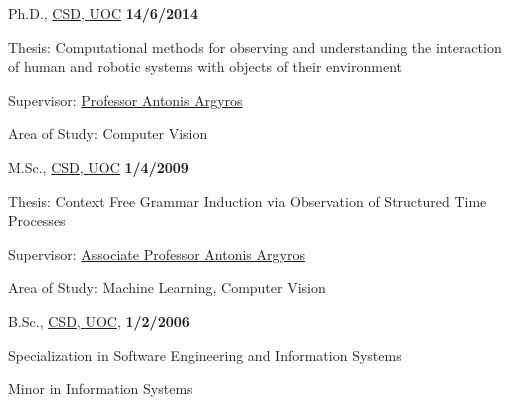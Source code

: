 \documentclass[10pt]{article}
\newenvironment{outerlist}[1][\enskip\textbullet]%
        {\begin{itemize}[#1]}{\end{itemize}%
         \vspace{-.6\baselineskip}}
\newenvironment{innerlist}[1][\enskip\textbullet]%
        {\begin{compactitem}[#1]}{\end{compactitem}}
\begin{document}
\begin{outerlist}

\item[] Ph.D., 
        \href{http://www.csd.uoc.gr/}
             {\ac{CSD}, \ac{UOC}} 
        \hfill \textbf{14/6/2014}
        \begin{innerlist}
        \item Thesis: Computational methods for observing and understanding the interaction of human and robotic systems with objects of their environment        \item Supervisor: 
              \href{http://www.ics.forth.gr/~argyros}
                   {Professor Antonis Argyros}
        \item Area of Study: Computer Vision
        \end{innerlist}

\item[] M.Sc., 
        \href{http://www.csd.uoc.gr/}
             {\ac{CSD}, \ac{UOC}} 
        \hfill \textbf{1/4/2009}
        \begin{innerlist}
        \item Thesis: Context Free Grammar Induction via Observation of Structured Time Processes
        \item Supervisor: 
              \href{http://www.ics.forth.gr/~argyros}
                   {Associate Professor Antonis Argyros}
        \item Area of Study: Machine Learning, Computer Vision
        \end{innerlist}

\item[] B.Sc., 
        \href{http://www.csd.uoc.gr/}
             {\ac{CSD}, \ac{UOC}}, \hfill \textbf{1/2/2006}
        \begin{innerlist}
        \item Specialization in Software Engineering and Information Systems
        \item Minor in Information Systems
        \end{innerlist}

\end{outerlist}


\end{document}
